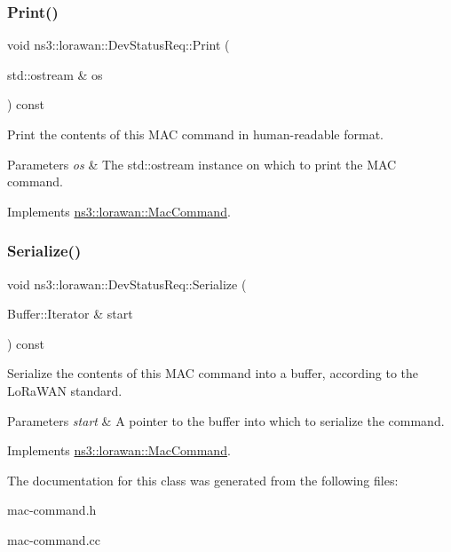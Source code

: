 \subsubsection{\texorpdfstring{Print()}{Print()}}
{\footnotesize\ttfamily void ns3\+::lorawan\+::\+Dev\+Status\+Req\+::\+Print (\begin{DoxyParamCaption}\item[{std\+::ostream \&}]{os }\end{DoxyParamCaption}) const\hspace{0.3cm}{\ttfamily [virtual]}}

Print the contents of this M\+AC command in human-\/readable format.


\begin{DoxyParams}{Parameters}
{\em os} & The std\+::ostream instance on which to print the M\+AC command. \\
\hline
\end{DoxyParams}


Implements \hyperlink{classns3_1_1lorawan_1_1MacCommand_a6bf88db38dab7dcd817811a9fb59f920}{ns3\+::lorawan\+::\+Mac\+Command}.

\mbox{\label{classns3_1_1lorawan_1_1DevStatusReq_a98693e79ac85f1bf19980cc189ba27f6}} 
\subsubsection{\texorpdfstring{Serialize()}{Serialize()}}
{\footnotesize\ttfamily void ns3\+::lorawan\+::\+Dev\+Status\+Req\+::\+Serialize (\begin{DoxyParamCaption}\item[{Buffer\+::\+Iterator \&}]{start }\end{DoxyParamCaption}) const\hspace{0.3cm}{\ttfamily [virtual]}}

Serialize the contents of this M\+AC command into a buffer, according to the Lo\+Ra\+W\+AN standard.


\begin{DoxyParams}{Parameters}
{\em start} & A pointer to the buffer into which to serialize the command. \\
\hline
\end{DoxyParams}


Implements \hyperlink{classns3_1_1lorawan_1_1MacCommand_a0ed44b33942ddc3dc9694dc06ab0b87f}{ns3\+::lorawan\+::\+Mac\+Command}.



The documentation for this class was generated from the following files\+:\begin{DoxyCompactItemize}
\item 
mac-\/command.\+h\item 
mac-\/command.\+cc\end{DoxyCompactItemize}
